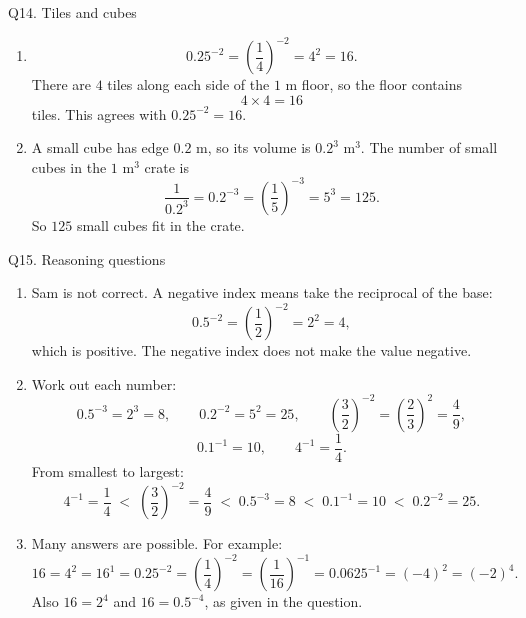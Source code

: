\documentclass[12pt,a4paper]{article}
\begin{document}
\begin{solution}{Q14. Tiles and cubes}
\begin{enumerate}[label=\textbf{(\alph*)}]
\item
\[
0.25^{-2}=\left(\frac14\right)^{-2}=4^2=16.
\]
There are \(4\) tiles along each side of the \(1\) m floor, so the floor contains
\[
4\times4=16
\]
tiles. This agrees with \(0.25^{-2}=16\).

\item A small cube has edge \(0.2\) m, so its volume is \(0.2^3\) m\(^3\). The number of small cubes in the \(1\) m\(^3\) crate is
\[
\frac{1}{0.2^3}=0.2^{-3}
=\left(\frac15\right)^{-3}
=5^3
=125.
\]
So \(125\) small cubes fit in the crate.
\end{enumerate}
\end{solution}

\begin{solution}{Q15. Reasoning questions}
\begin{enumerate}[label=\textbf{(\alph*)}]
\item Sam is not correct. A negative index means take the reciprocal of the base:
\[
0.5^{-2}=\left(\frac12\right)^{-2}=2^2=4,
\]
which is positive. The negative index does not make the value negative.

\item Work out each number:
\[
0.5^{-3}=2^3=8,\qquad
0.2^{-2}=5^2=25,\qquad
\left(\frac32\right)^{-2}=\left(\frac23\right)^2=\frac49,
\]
\[
0.1^{-1}=10,\qquad
4^{-1}=\frac14.
\]
From smallest to largest:
\[
4^{-1}=\frac14
\;<\;
\left(\frac32\right)^{-2}=\frac49
\;<\;
0.5^{-3}=8
\;<\;
0.1^{-1}=10
\;<\;
0.2^{-2}=25.
\]

\item Many answers are possible. For example:
\[
16=4^2=16^1=0.25^{-2}
=\left(\frac14\right)^{-2}
=\left(\frac1{16}\right)^{-1}
=0.0625^{-1}
=(-4)^2
=(-2)^4.
\]
Also \(16=2^4\) and \(16=0.5^{-4}\), as given in the question.
\end{enumerate}
\end{solution}
\end{document}
